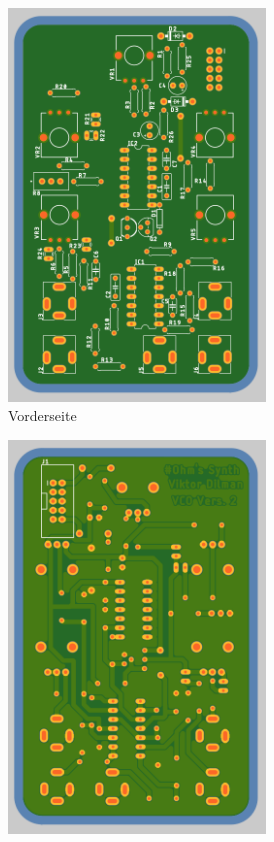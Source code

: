 \begin{figure}[h]
	\centering
	\begin{subfigure}{.5\textwidth}
		\centering
		\includegraphics[width=0.75\textwidth]{figures/VCO_Rendering_Front}
		\caption{Vorderseite}
		\label{fig:VCO_Front}
	\end{subfigure}%
	\begin{subfigure}{.5\textwidth}
		\centering
		\includegraphics[width=0.75\textwidth]{figures/VCO_Rendering_Back}

\end{subfigure}
\end{figure}
